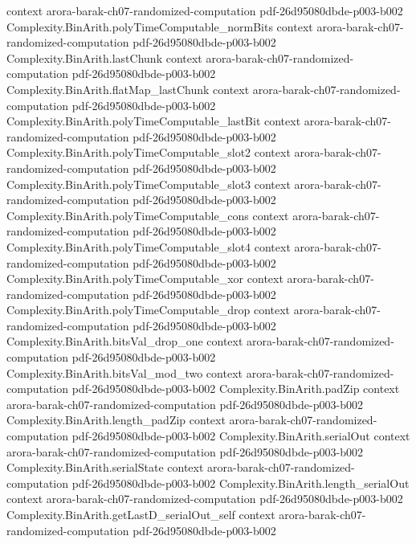 \begin{theorem}
  {context}
  {arora-barak-ch07-randomized-computation}
  {pdf-26d95080dbde-p003-b002}
\proofstep
  {Complexity.BinArith.polyTimeComputable_normBits}
  {context}
  {arora-barak-ch07-randomized-computation}
  {pdf-26d95080dbde-p003-b002}
\proofstep
  {Complexity.BinArith.lastChunk}
  {context}
  {arora-barak-ch07-randomized-computation}
  {pdf-26d95080dbde-p003-b002}
\proofstep
  {Complexity.BinArith.flatMap_lastChunk}
  {context}
  {arora-barak-ch07-randomized-computation}
  {pdf-26d95080dbde-p003-b002}
\proofstep
  {Complexity.BinArith.polyTimeComputable_lastBit}
  {context}
  {arora-barak-ch07-randomized-computation}
  {pdf-26d95080dbde-p003-b002}
\proofstep
  {Complexity.BinArith.polyTimeComputable_slot2}
  {context}
  {arora-barak-ch07-randomized-computation}
  {pdf-26d95080dbde-p003-b002}
\proofstep
  {Complexity.BinArith.polyTimeComputable_slot3}
  {context}
  {arora-barak-ch07-randomized-computation}
  {pdf-26d95080dbde-p003-b002}
\proofstep
  {Complexity.BinArith.polyTimeComputable_cons}
  {context}
  {arora-barak-ch07-randomized-computation}
  {pdf-26d95080dbde-p003-b002}
\proofstep
  {Complexity.BinArith.polyTimeComputable_slot4}
  {context}
  {arora-barak-ch07-randomized-computation}
  {pdf-26d95080dbde-p003-b002}
\proofstep
  {Complexity.BinArith.polyTimeComputable_xor}
  {context}
  {arora-barak-ch07-randomized-computation}
  {pdf-26d95080dbde-p003-b002}
\proofstep
  {Complexity.BinArith.polyTimeComputable_drop}
  {context}
  {arora-barak-ch07-randomized-computation}
  {pdf-26d95080dbde-p003-b002}
\proofstep
  {Complexity.BinArith.bitsVal_drop_one}
  {context}
  {arora-barak-ch07-randomized-computation}
  {pdf-26d95080dbde-p003-b002}
\proofstep
  {Complexity.BinArith.bitsVal_mod_two}
  {context}
  {arora-barak-ch07-randomized-computation}
  {pdf-26d95080dbde-p003-b002}
\proofstep
  {Complexity.BinArith.padZip}
  {context}
  {arora-barak-ch07-randomized-computation}
  {pdf-26d95080dbde-p003-b002}
\proofstep
  {Complexity.BinArith.length_padZip}
  {context}
  {arora-barak-ch07-randomized-computation}
  {pdf-26d95080dbde-p003-b002}
\proofstep
  {Complexity.BinArith.serialOut}
  {context}
  {arora-barak-ch07-randomized-computation}
  {pdf-26d95080dbde-p003-b002}
\proofstep
  {Complexity.BinArith.serialState}
  {context}
  {arora-barak-ch07-randomized-computation}
  {pdf-26d95080dbde-p003-b002}
\proofstep
  {Complexity.BinArith.length_serialOut}
  {context}
  {arora-barak-ch07-randomized-computation}
  {pdf-26d95080dbde-p003-b002}
\proofstep
  {Complexity.BinArith.getLastD_serialOut_self}
  {context}
  {arora-barak-ch07-randomized-computation}
  {pdf-26d95080dbde-p003-b002}

\end{theorem}
